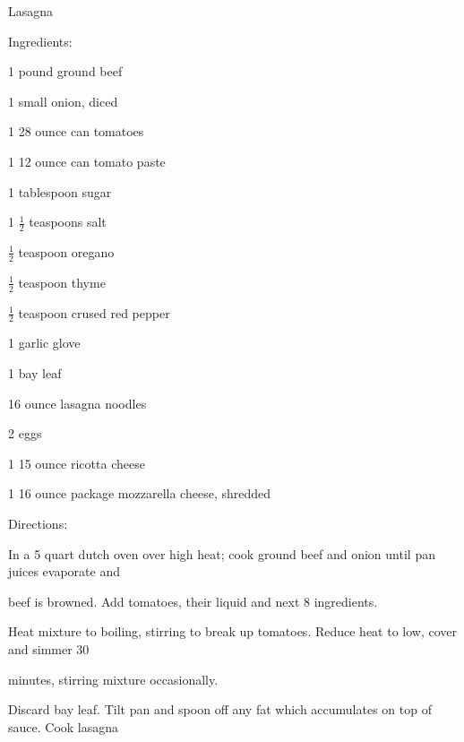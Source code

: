 \documentclass[a4paper,portrait,12pt]{book}
\begin{document}
\newpage
Lasagna




Ingredients:




1 pound ground beef




1 small onion, diced




1 28 ounce can tomatoes




1 12 ounce can tomato paste




1 tablespoon sugar




1 $\frac{1}{2}$ teaspoons salt




$\frac{1}{2}$ teaspoon oregano




$\frac{1}{2}$ teaspoon thyme




$\frac{1}{2}$ teaspoon crused red pepper




1 garlic glove




1 bay leaf




16 ounce lasagna noodles




2 eggs




1 15 ounce ricotta cheese




1 16 ounce package mozzarella cheese, shredded




Directions:




In a 5 quart dutch oven over high heat; cook ground beef and onion until pan juices evaporate and




beef is browned. Add tomatoes, their liquid and next 8 ingredients.




Heat mixture to boiling, stirring to break up tomatoes. Reduce heat to low, cover and simmer 30




minutes, stirring mixture occasionally.




Discard bay leaf. Tilt pan and spoon off any fat which accumulates on top of sauce. Cook lasagna
\end{document}
